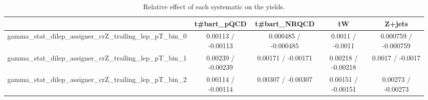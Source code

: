 \documentclass[10pt]{article}
\begin{document}
\begin{table}[htbp]
\begin{center}
\begin{tabular}{|c|c|c|c|c|}
\hline 
      & t#bar{t}_{pQCD}      & t#bar{t}_{NRQCD}      & tW      & Z+jets \\ 
\hline 
  gamma_stat_dilep_assigner_crZ_trailing_lep_pT_bin_0 & 0.00113 / -0.00113 & 0.000485 / -0.000485 & 0.0011 / -0.0011 & 0.000759 / -0.000759 \\ 
  gamma_stat_dilep_assigner_crZ_trailing_lep_pT_bin_1 & 0.00239 / -0.00239 & 0.00171 / -0.00171 & 0.00218 / -0.00218 & 0.0017 / -0.0017 \\ 
  gamma_stat_dilep_assigner_crZ_trailing_lep_pT_bin_2 & 0.00114 / -0.00114 & 0.00307 / -0.00307 & 0.00151 / -0.00151 & 0.00273 / -0.00273 \\ 
\hline 
\end{tabular} 
\caption{Relative effect of each systematic on the yields.} 
\end{center} 
\end{table} 
\end{document}
